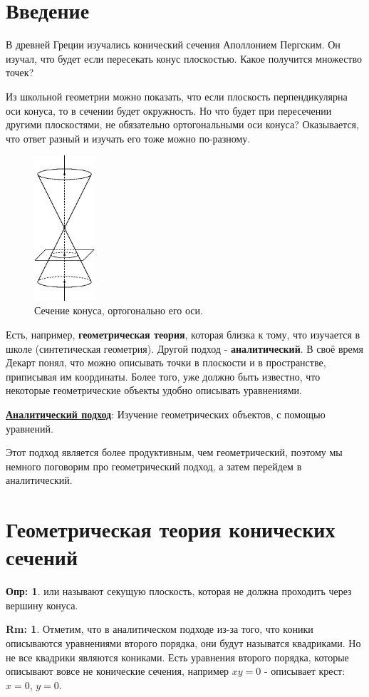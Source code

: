 \documentclass[12pt]{article}
\theoremstyle{definition}
\newtheorem{defn}{Опр:}
\newtheorem{rem}{Rm:}
\begin{document}
\section*{Введение}
В древней Греции изучались конический сечения Аполлонием Пергским. Он изучал, что будет если пересекать конус плоскостью. Какое получится множество точек? 

Из школьной геометрии можно показать, что если плоскость перпендикулярна оси конуса, то в сечении будет окружность. Но что будет при пересечении другими плоскостями, не обязательно ортогональными оси конуса? Оказывается, что ответ разный и изучать его тоже можно по-разному. 
\begin{figure}[H]
	\centering
	\includegraphics[width=0.20\textwidth]{ANGL1_1.eps}
	\caption{Сечение конуса, ортогонально его оси.}
	\label{1_1}
\end{figure}
Есть, например, \textbf{геометрическая теория}, которая близка к тому, что изучается в школе (синтетическая геометрия). Другой подход - \textbf{аналитический}. В своё время Декарт понял, что можно описывать точки в плоскости и в пространстве, приписывая им координаты. Более того, уже должно быть известно, что некоторые геометрические объекты удобно описывать уравнениями. 

\textbf{\uline{Аналитический подход}}: Изучение геометрических объектов, с помощью уравнений. 

Этот подход является более продуктивным, чем геометрический, поэтому мы немного поговорим про геометрический подход, а затем перейдем в аналитический.
\newpage
\section*{Геометрическая теория конических сечений}
\begin{defn}
	 или  называют секущую плоскость, которая не должна проходить через вершину конуса.
\end{defn}
\begin{rem}
	Отметим, что в аналитическом подходе из-за того, что коники описываются уравнениями второго порядка, они будут называтся квадриками. Но не все квадрики являются кониками. Есть уравнения второго порядка, которые описывают вовсе не конические сечения, например $xy = 0$ - описывает крест: $x = 0, \, y = 0$.
\end{rem}
\end{document}
